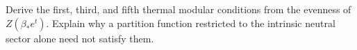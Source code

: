 \begin{exercise}\label{ex:scaling-modular}
Derive the first, third, and fifth thermal modular conditions from
the evenness of $Z(\beta_*e^t)$. Explain why a partition function restricted
to the intrinsic neutral sector alone need not satisfy them.

\par\smallskip{}\par
\end{exercise}
